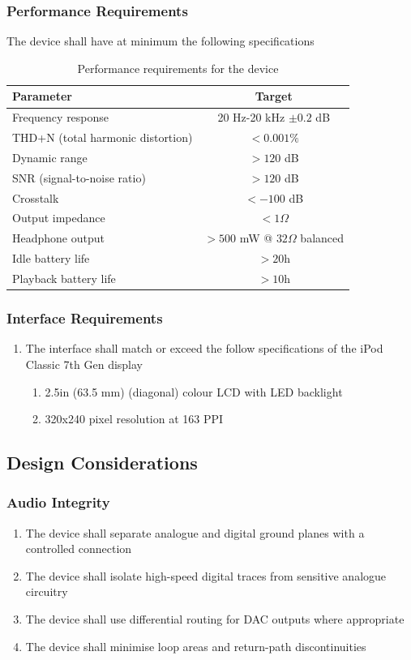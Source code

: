 \documentclass{article}
\begin{document}
\subsubsection{Performance Requirements}
The device shall have at minimum the following specifications
\begin{table}[H]
    \centering
    \caption{Performance requirements for the device}
    \label{tab:1}
    \begin{tabular}{l|c}
        Parameter & Target\\
        \hline
        \hline
        Frequency response & 20 Hz-20 kHz $\pm 0.2$ dB \\
        THD+N (total harmonic distortion) & $<0.001\%$ \\
        Dynamic range & $>120$ dB \\
        SNR (signal-to-noise ratio) & $>120$ dB \\
        Crosstalk & $<-100$ dB \\
        Output impedance & $<1\Omega $ \\
        Headphone output & $>500$ mW @ $32\Omega $ balanced \\
        Idle battery life & $>20$h \\
        Playback battery life & $>10$h
    \end{tabular}
\end{table}

\subsubsection{Interface Requirements}
\begin{enumerate}
    \item The interface shall match or exceed the follow specifications of the iPod Classic 7th Gen display
        \begin{enumerate}
            \item 2.5in (63.5 mm) (diagonal) colour LCD with LED backlight
            \item 320x240 pixel resolution at 163 PPI
        \end{enumerate}
\end{enumerate}

\subsection{Design Considerations}
\subsubsection{Audio Integrity}
\begin{enumerate}
    \item The device shall separate analogue and digital ground planes with a controlled connection
    \item The device shall isolate high-speed digital traces from sensitive analogue circuitry
    \item The device shall use differential routing for DAC outputs where appropriate
    \item The device shall minimise loop areas and return-path discontinuities
\end{enumerate}
\end{document}

